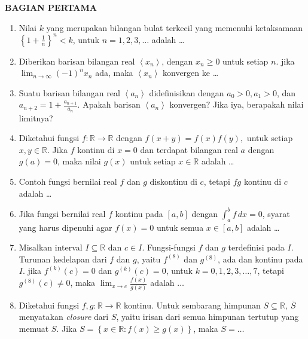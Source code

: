 \documentclass[12pt,twoside]{article}
\begin{document}
\textbf{BAGIAN PERTAMA}
\begin{enumerate}
	\item Nilai $k$ yang merupakan bilangan bulat terkecil yang memenuhi ketaksamaan $\left\lbrace 1+ \frac{1}{n}\right\rbrace^n < k$, untuk $n = 1,2,3,\dots$ adalah \dots

	\item Diberikan barisan bilangan real $\left<x_n\right>$, dengan $x_n \geq 0$ untuk setiap $n$. jika $\displaystyle\lim_{n \to \infty}\left(-1\right)^nx_n$ ada, maka $\left<x_n\right>$ konvergen ke \dots

	\item Suatu barisan bilangan real  $\left<a_n\right>$ didefinisikan dengan $a_0 > 0, a_1 > 0$, dan $a_{n+2} = 1 + \frac{a_{n+1}}{a_n}$. Apakah barisan $\left<a_n\right>$ konvergen$?$ Jika iya, berapakah nilai limitnya?

	\item Diketahui fungsi $f : \mathbb{R} \to \mathbb{R} $ dengan $f(x+y) = f(x)f(y),$ untuk setiap $x,y \in \mathbb{R}$. Jika $f$ kontinu di $x=0$ dan terdapat bilangan real $a$ dengan $g(a) = 0$, maka nilai $g(x)$ untuk setiap $x \in \mathbb{R}$ adalah \dots

	\item Contoh fungsi bernilai real $f$ dan $g$ diskontinu di $c$, tetapi $fg$ kontinu di $c$ adalah \dots

	\item Jika fungsi bernilai real $f$ kontinu pada $\left[a,b\right]$ dengan $\displaystyle\int_{a}^{b} f \,dx=  0$, syarat yang harus dipenuhi agar $f(x) = 0$ untuk semua $x \in \left[a,b\right]$ adalah \dots

	\item Misalkan interval $I \subseteq \mathbb{R} $ dan $c \in I$. Fungsi-fungsi $f$ dan $g$ terdefinisi pada $I$. Turunan kedelapan dari $f$ dan $g$, yaitu $f^{(8)} $ dan $g^{(8)} $, ada dan kontinu pada $I$. jika $f^{(k)}(c) = 0$ dan $g^{(k)}(c) = 0$, untuk $k = 0,1,2,3,\dots,7$, tetapi $g^{(8)}(c) \not= 0$, maka $\displaystyle\lim_{x \to c} \frac{f(x)}{g(x)}$ adalah $\dots$

	\item Diketahui fungsi $f,g : \mathbb{R} \to \mathbb{R}$ kontinu. Untuk sembarang himpunan $S \subseteq \mathbb{R},~ \overline{S}$ menyatakan \textit{closure} dari $S$, yaitu irisan dari semua himpunan tertutup yang memuat $S$. Jika $S = \left\lbrace x \in \mathbb{R} : f(x) \geq g(x) \right\rbrace$, maka $S = \dots$

\end{enumerate}
\end{document}
